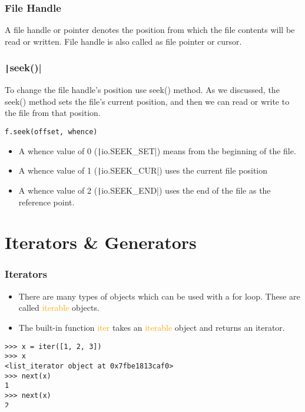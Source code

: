 \documentclass{../py-lecture}
\begin{document}
\begin{frame}
  \frametitle{File Handle}
  \begin{block}{}
    A file handle or pointer denotes the position from which the file contents will be read or written. File handle is also called as file pointer or cursor.
  \end{block}
\end{frame}

\begin{frame}[fragile]
  \frametitle{\texttt|seek()|}
  \begin{block}{}
    To change the file handle’s position use seek() method. As we discussed, the seek() method sets the file’s current position,
    and then we can read or write to the file from that position.
  \end{block}
  \begin{verbatim}
f.seek(offset, whence)
  \end{verbatim}
  \begin{itemize}
    \item A whence value of 0 (\texttt|io.SEEK_SET|) means from the beginning of the file.
    \item A whence value of 1 (\texttt|io.SEEK_CUR|) uses the current file position
    \item A whence value of 2 (\texttt|io.SEEK_END|) uses the end of the file as the reference point. 
  \end{itemize}
\end{frame}

\section{Iterators \& Generators}

\begin{frame}[fragile]
	\frametitle{Iterators}
  \begin{itemize}
    \item There are many types of objects which can be used with a for loop.
    These are called \textcolor{Orange}{iterable} objects.
    \item The built-in function \textcolor{Orange}{iter} takes an \textcolor{Orange}{iterable}
    object and returns an iterator.
  \end{itemize}
  \begin{verbatim}
>>> x = iter([1, 2, 3])
>>> x
<list_iterator object at 0x7fbe1813caf0>
>>> next(x)
1
>>> next(x)
2
>>> next(x)
3
  \end{verbatim}
\end{frame}
\end{document}
